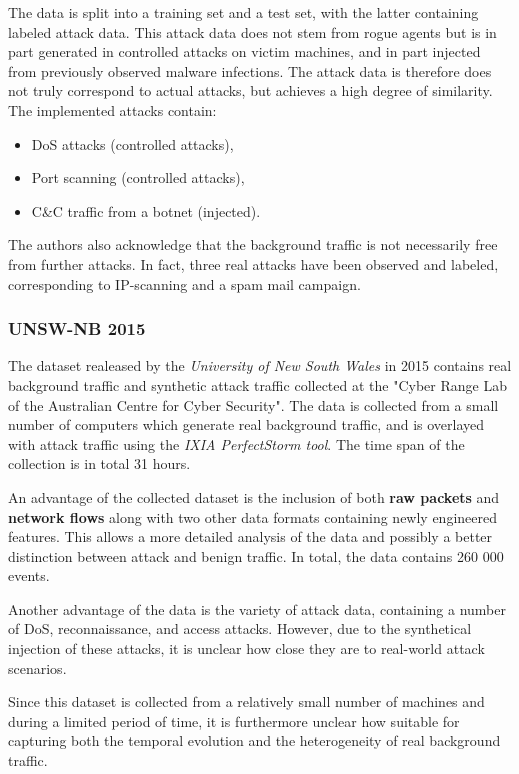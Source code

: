 \documentclass[a4paper,12pt,twoside]{report}
\begin{document}
The data is split into a training set and a test set, with the latter containing labeled attack data. This attack data does not stem from rogue agents but is in part generated in controlled attacks on victim machines, and in part injected from previously observed malware infections. The attack data is therefore does not truly correspond to actual attacks, but achieves a high degree of similarity. The implemented attacks contain:
\begin{itemize}
\item DoS attacks (controlled attacks),
\item Port scanning (controlled attacks),
\item C\&C traffic from a botnet (injected).
\end{itemize}

The authors also acknowledge that the background traffic is not necessarily free from further attacks. In fact, three real attacks have been observed and labeled, corresponding to IP-scanning and a spam mail campaign.

\subsubsection*{UNSW-NB 2015 \cite{moustafa_unsw-nb15:_2015}}

The dataset realeased by the \textit{University of New South Wales} in 2015 contains real background traffic and synthetic attack traffic collected at the "Cyber Range Lab of the Australian Centre for Cyber Security". The data is collected from a small number of computers which generate real background traffic, and is overlayed with attack traffic using the \textit{IXIA PerfectStorm tool}. The time span of the collection is in total 31 hours.

An advantage of the collected dataset is the inclusion of both \textbf{raw packets} and \textbf{network flows} along with two other data formats containing newly engineered features. This allows a more detailed analysis of the data and possibly a better distinction between attack and benign traffic. In total, the data contains 260 000 events.

Another advantage of the data is the variety of attack data, containing a number of DoS, reconnaissance, and access attacks. However, due to the synthetical injection of these attacks, it is unclear how close they are to real-world attack scenarios.

Since this dataset is collected from a relatively small number of machines and during a limited period of time, it is furthermore unclear how suitable for capturing both the temporal evolution and the heterogeneity of real background traffic.
\end{document}
